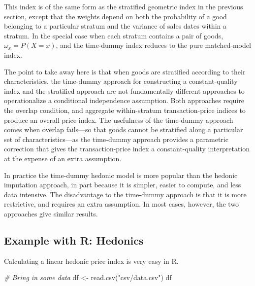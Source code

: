 \documentclass[
]{article}
\newenvironment{Shaded}{\begin{snugshade}}{\end{snugshade}}
\newcommand{\CommentTok}[1]{\textcolor[rgb]{0.56,0.35,0.01}{\textit{#1}}}
\newcommand{\FunctionTok}[1]{\textcolor[rgb]{0.00,0.00,0.00}{#1}}
\newcommand{\NormalTok}[1]{#1}
\newcommand{\OtherTok}[1]{\textcolor[rgb]{0.56,0.35,0.01}{#1}}
\newcommand{\StringTok}[1]{\textcolor[rgb]{0.31,0.60,0.02}{#1}}
\begin{document}
This index is of the same form as the stratified geometric index in the previous section, except that the weights depend on both the probability of a good belonging to a particular stratum and the variance of sales dates within a stratum. In the special case when each stratum contains a pair of goods, \(\omega_{x} = P(X = x)\), and the time-dummy index reduces to the pure matched-model index.

The point to take away here is that when goods are stratified according to their characteristics, the time-dummy approach for constructing a constant-quality index and the stratified approach are not fundamentally different approaches to operationalize a conditional independence assumption. Both approaches require the overlap condition, and aggregate within-stratum transaction-price indices to produce an overall price index. The usefulness of the time-dummy approach comes when overlap fails---so that goods cannot be stratified along a particular set of characteristics---as the time-dummy approach provides a parametric correction that gives the transaction-price index a constant-quality interpretation at the expense of an extra assumption.

In practice the time-dummy hedonic model is more popular than the hedonic imputation approach, in part because it is simpler, easier to compute, and less data intensive. The disadvantage to the time-dummy approach is that it is more restrictive, and requires an extra assumption. In most cases, however, the two approaches give similar results.

\hypertarget{example-with-r-hedonics}{%
\subsection{Example with R: Hedonics}\label{example-with-r-hedonics}}

Calculating a linear hedonic price index is very easy in R.

\begin{Shaded}
\begin{Highlighting}[]
\CommentTok{\# Bring in some data}
\NormalTok{df }\OtherTok{\textless{}{-}} \FunctionTok{read.csv}\NormalTok{(}\StringTok{"csv/data.csv"}\NormalTok{)}
\NormalTok{df}
\end{Highlighting}
\end{Shaded}
\end{document}
